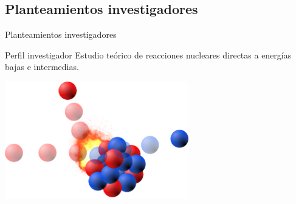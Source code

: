 \documentclass{beamer}
\begin{document}
\subsection{Planteamientos investigadores}
\begin{frame}{Planteamientos investigadores}
    \begin{block}{Perfil investigador}
       Estudio teórico de reacciones nucleares directas a energías bajas e intermedias.
    \end{block}
    \begin{center}
    \includegraphics[width=0.6\textwidth]{portada.png}
    \end{center}
\end{frame}


    
    
    
    
\end{document}
